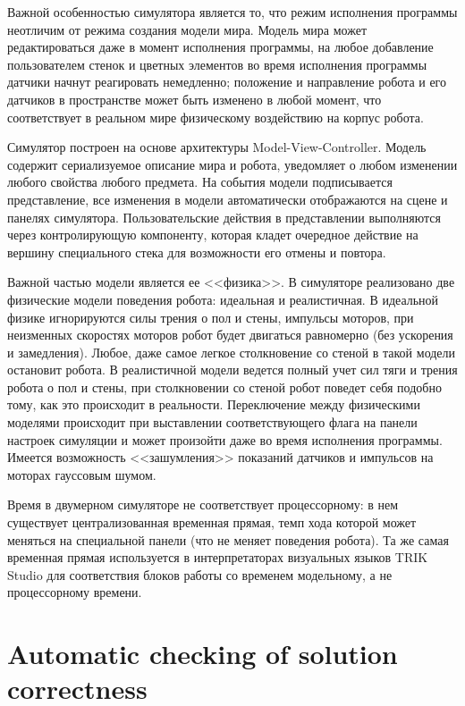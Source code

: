 \documentclass[conference]{IEEEtran}
\begin{document}
Важной особенностью симулятора является то, что режим исполнения программы неотличим от режима создания модели мира. Модель мира может редактироваться даже в момент исполнения программы, на любое добавление пользователем стенок и цветных элементов во время исполнения программы датчики начнут реагировать немедленно; положение и направление робота и его датчиков в пространстве может быть изменено в любой момент, что соответствует в реальном мире физическому воздействию на корпус робота.

Симулятор построен на основе архитектуры Model-View-Controller. Модель содержит сериализуемое описание мира и робота, уведомляет о любом изменении любого свойства любого предмета. На события модели подписывается представление, все изменения в модели автоматически отображаются на сцене и панелях симулятора. Пользовательские действия в представлении выполняются через контролирующую компоненту, которая кладет очередное действие на вершину специального стека для возможности его отмены и повтора.

Важной частью модели является ее <<физика>>. В симуляторе реализовано две физические модели поведения робота: идеальная и реалистичная. В идеальной физике игнорируются силы трения о пол и стены, импульсы моторов, при неизменных скоростях моторов робот будет двигаться равномерно (без ускорения и замедления). Любое, даже самое легкое столкновение со стеной в такой модели остановит робота. В реалистичной модели ведется полный учет сил тяги и трения робота о пол и стены, при столкновении со стеной робот поведет себя подобно тому, как это происходит в реальности. Переключение между физическими моделями происходит при выставлении соответствующего флага на панели настроек симуляции и может произойти даже во время исполнения программы. Имеется возможность <<зашумления>> показаний датчиков и импульсов на моторах гауссовым шумом.

Время в двумерном симуляторе не соответствует процессорному: в нем существует централизованная временная прямая, темп хода которой может меняться на специальной панели (что не меняет поведения робота). Та же самая временная прямая используется в интерпретаторах визуальных языков TRIK Studio для соответствия блоков работы со временем модельному, а не процессорному времени.

\section{Automatic checking of solution correctness}
\label{chapter:constraintsChecker}
\end{document}
